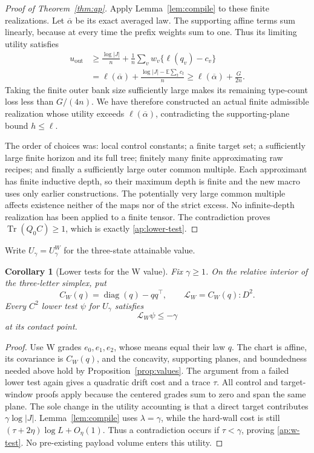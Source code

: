 \documentclass[11pt]{article}
\numberwithin{equation}{section}
\newtheorem{corollary}[theorem]{Corollary}
\theoremstyle{definition}
\theoremstyle{remark}
\begin{document}
\begin{proof}[Proof of Theorem~\ref{thm:ap}]
Apply Lemma~\ref{lem:compile} to these finite realizations.  Let
\(\overline\alpha\) be its exact averaged law.  The supporting affine
terms sum linearly, because at every time the prefix weights sum to one.
Thus its limiting utility satisfies
\begin{align*}
 u_{\mathrm{out}}
 &\geq\frac{\log|J|}n
   +\frac1n\sum_v w_v\{\ell(q_v)-c_v\}\\
 &=\ell(\overline\alpha)
   +\frac{\log|J|-\mathbb E\sum_t c_t}{n}
 \geq\ell(\overline\alpha)+\frac{G}{2n}.
\end{align*}
Taking the finite outer bank size sufficiently large makes its remaining
type-count loss less than \(G/(4n)\).  We have therefore constructed
an actual finite admissible realization whose utility exceeds
\(\ell(\overline\alpha)\), contradicting the supporting-plane bound
\(h\leq\ell\).

The order of choices was: local control constants; a finite target set;
a sufficiently large finite horizon and its full tree; finitely many
finite approximating raw recipes; and finally a sufficiently large outer
common multiple.  Each approximant has finite inductive depth, so their
maximum depth is finite and the new macro uses only earlier constructions.
The potentially very large common multiple affects existence neither
of the maps nor of the strict excess.  No infinite-depth realization has
been applied to a finite tensor.  The contradiction proves
\(\operatorname{Tr}(Q_0C)\geq1\), which is exactly \eqref{ap:lower-test}.
\end{proof}

Write \(U_\gamma=U^W_\gamma\) for the three-state attainable value.

\begin{corollary}[Lower tests for the W value]\label{cor:w-ap}
Fix \(\gamma\geq1\).  On the relative interior of the three-letter
simplex, put
\[
 C_W(q)=\operatorname{diag}(q)-qq^\top,
 \qquad \mathcal L_W=C_W(q):D^2.
\]
Every \(C^2\) lower test \(\psi\) for \(U_\gamma\) satisfies
\begin{equation}\label{ap:w-test}
 \mathcal L_W\psi\leq-\gamma
\end{equation}
at its contact point.
\end{corollary}

\begin{proof}
Use W grades \(e_0,e_1,e_2\), whose means equal their law \(q\).
The chart is affine, its covariance is \(C_W(q)\), and the concavity,
supporting planes, and boundedness needed above hold by
Proposition~\ref{prop:values}.  The argument from a failed lower test
again gives a quadratic drift cost and a trace \(\tau\).  All control
and target-window proofs apply because the centered grades sum to zero
and span the same plane.  The sole change in the utility accounting is
that a direct target contributes \(\gamma\log|J|\).  Lemma~\ref{lem:compile}
uses \(\lambda=\gamma\), while the hard-wall cost is still
\((\tau+2\eta)\log L+O_\eta(1)\).  Thus a contradiction occurs if
\(\tau<\gamma\), proving \eqref{ap:w-test}.  No pre-existing payload
volume enters this utility.
\end{proof}
\end{document}
